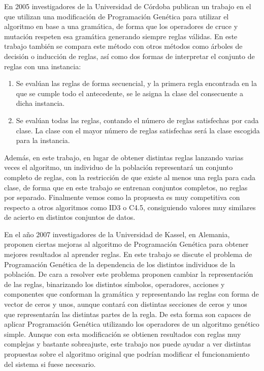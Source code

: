 En 2005 investigadores de la Universidad de Córdoba publican un trabajo \cite{grammarBasedPG} en el que utilizan una modificación de Programación Genética para utilizar el algoritmo en base a una gramática, de forma que los operadores de cruce y mutación respeten esa gramática generando siempre reglas válidas. En este trabajo también se compara este método con otros métodos como árboles de decisión o inducción de reglas, así como dos formas de interpretar el conjunto de reglas con una instancia:

\begin{enumerate}
	\item Se evalúan las reglas de forma secuencial, y la primera regla encontrada en la que se cumple todo el antecedente, se le asigna la clase del consecuente a dicha instancia.
	\item Se evalúan todas las reglas, contando el número de reglas satisfechas por cada clase. La clase con el mayor número de reglas satisfechas será la clase escogida para la instancia.
\end{enumerate}

Además, en este trabajo, en lugar de obtener distintas reglas lanzando varias veces el algoritmo, un individuo de la población representará un conjunto completo de reglas, con la restricción de que existe al menos una regla para cada clase, de forma que en este trabajo se entrenan conjuntos completos, no reglas por separado. Finalmente vemos como la propuesta es muy competitiva con respecto a otros algoritmos como ID3 o C4.5, consiguiendo valores muy similares de acierto en distintos conjuntos de datos.

En el año 2007 investigadores de la Universidad de Kassel, en Alemania, proponen \cite{mejorasPGreglas} ciertas mejoras al algoritmo de Programación Genética para obtener mejores resultados al aprender reglas. En este trabajo se discute el problema de Programación Genética de la dependencia de los distintos individuos de la población. De cara a resolver este problema proponen cambiar la representación de las reglas, binarizando los distintos símbolos, operadores, acciones y componentes que conforman la gramática y representando las reglas con forma de vector de ceros y unos, aunque contará con distintas secciones de ceros y unos que representarán las distintas partes de la regla. De esta forma son capaces de aplicar Programación Genética utilizando los operadores de un algoritmo genético simple. Aunque con esta modificación se obtienen resultados con reglas muy complejas y bastante sobreajuste, este trabajo nos puede ayudar a ver distintas propuestas sobre el algoritmo original que podrían modificar el funcionamiento del sistema si fuese necesario.


\newpage
